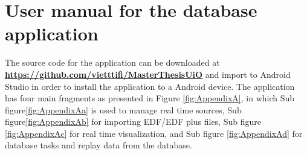 
\chapter{User manual for the database application}
\label{AppendixA}
The source code for the application can be downloaded at \href{https://github.com/vietttifi/MasterThesisUiO}{\textbf{https://github.com/vietttifi/MasterThesisUiO}} and import to Android Studio in order to install the application to a Android device. The application has four main fragments as presented in Figure \ref{fig:AppendixA}, in which Sub figure\ref{fig:AppendixAa} is used to manage real time sources, Sub figure\ref{fig:AppendixAb} for importing EDF/EDF plus files, Sub figure \ref{fig:AppendixAc} for real time visualization, and Sub figure \ref{fig:AppendixAd} for database tasks and replay data from the database.
